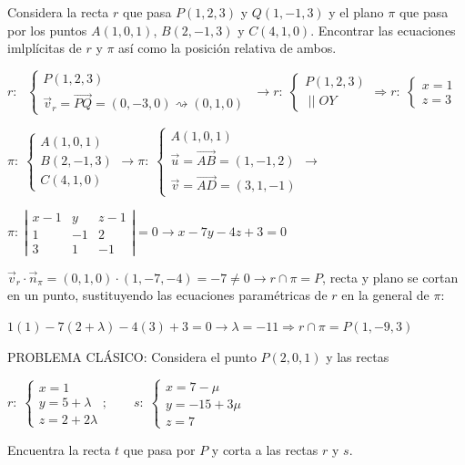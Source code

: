 \begin{ejre}
	Considera la recta $r$ que pasa $P(1,2,3)$ y $Q(1,-1,3)$ y el plano $\pi$ que pasa por los puntos $A(1,0,1)$, $B(2,-1,3)$ y $C(4,1,0)$. Encontrar las ecuaciones imlplícitas de $r$ y $\pi$ así como la posición relativa de ambos.
\end{ejre}

\begin{proofw}\renewcommand{\qedsymbol}{$\diamond$}
	$r: \; $ \footnotesize{$\begin{cases} P(1,2,3) \\ \vec v_r=\overrightarrow
{PQ} = (0, -3, 0) \rightsquigarrow (0,1,0) \end{cases}$} \normalsize{$\to r:\;\begin{cases} P(1,2,3) \\ \;||\; OY \end{cases} \Rightarrow r:\; \begin{cases} x=1\\z=3 \end{cases}$}

\noindent $\pi:\; \begin{cases} A(1,0,1) \\ B(2,-1,3) \\ C(4,1,0) \end{cases} \to \pi:\; \begin{cases} A(1,0,1) \\ \vec u=\overrightarrow{AB}=(1,-1,2) \\ \vec v=\overrightarrow{AD}=(3, 1, -1) \end{cases} \to$

\noindent $\pi:\; \left| \begin{matrix} x-1&y&z-1\\1&-1&2\\3&1&-1 \end{matrix} \right|=0 \to x-7y-4z+3=0$

\noindent $\vec v_r \cdot \vec n_{\pi}=(0,1,0)\cdot (1,-7,-4)=-7\neq 0 \to r\cap \pi=P$, recta y plano se cortan en un punto, sustituyendo las ecuaciones paramétricas de $r$ en la general de $\pi$:

\noindent $1(1)-7(2+\lambda)-4(3)+3=0 \to \lambda=-11 \Rightarrow r\cap \pi=P(1,-9,3)$

\end{proofw}



\begin{ejre}
	PROBLEMA CLÁSICO: Considera el punto $P(2,0,1)$ y las rectas
	
	$r:\; \begin{cases} x=1 \\ y=5+\lambda \\ z=2+2\lambda \end{cases} ;\qquad  s:\; \begin{cases} x=7-\mu \\ y=-15+3\mu \\ z=7 \end{cases}$
	
	Encuentra la recta $t$ que pasa por $P$ y corta a las rectas $r$ y $s$.
\end{ejre}

